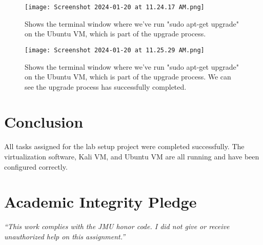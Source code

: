 \documentclass{article}
\begin{document}
\begin{figure}[H]
    \centering
    \texttt{[image: Screenshot 2024-01-20 at 11.24.17 AM.png]}
    \caption{Shows the terminal window where we've run "sudo apt-get upgrade" on the Ubuntu VM, which is part of the upgrade process.}
\end{figure}

\begin{figure}[H]
    \centering
    \texttt{[image: Screenshot 2024-01-20 at 11.25.29 AM.png]}
    \caption{Shows the terminal window where we've run "sudo apt-get upgrade" on the Ubuntu VM, which is part of the upgrade process. We can see the upgrade process has successfully completed.}
\end{figure}

\section{Conclusion}
All tasks assigned for the lab setup project were completed successfully. The virtualization software, Kali VM, and Ubuntu VM are all running and have been configured correctly.

\section*{Academic Integrity Pledge}
{\color{red}\textit{“This work complies with the JMU honor code. I did not give or receive unauthorized help on this assignment.”}}
\end{document}
